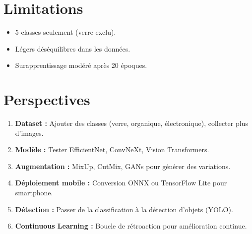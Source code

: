 \documentclass[12pt,a4paper]{report}
\begin{document}
\section{Limitations}
\begin{itemize}
    \item 5 classes seulement (verre exclu).
    \item Légers déséquilibres dans les données.
    \item Surapprentissage modéré après 20 époques.
\end{itemize}

\section{Perspectives}
\begin{enumerate}
    \item \textbf{Dataset :} Ajouter des classes (verre, organique, électronique), collecter plus d'images.
    \item \textbf{Modèle :} Tester EfficientNet, ConvNeXt, Vision Transformers.
    \item \textbf{Augmentation :} MixUp, CutMix, GANs pour générer des variations.
    \item \textbf{Déploiement mobile :} Conversion ONNX ou TensorFlow Lite pour smartphone.
    \item \textbf{Détection :} Passer de la classification à la détection d'objets (YOLO).
    \item \textbf{Continuous Learning :} Boucle de rétroaction pour amélioration continue.
\end{enumerate}
\end{document}
